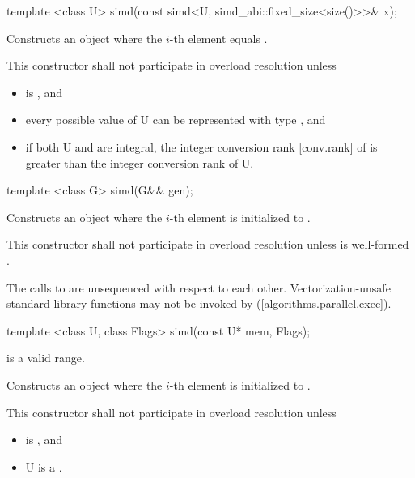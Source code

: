 \begin{itemdecl}
template <class U> simd(const simd<U, simd_abi::fixed_size<size()>>& x);
\end{itemdecl}
\begin{itemdescr}
  \pnum\effects Constructs an object where the $i$-th element equals  \foralli.

  \pnum\remarks This constructor shall not participate in overload resolution unless
  \begin{itemize}
    \item {} is \fixedsizescoped{}, and
    \item every possible value of \type U can be represented with type , and
    \item if both \type U and  are integral, the integer conversion rank [conv.rank] of  is greater than the integer conversion rank of \type U.
  \end{itemize}
\end{itemdescr}

\begin{itemdecl}
template <class G> simd(G&& gen);
\end{itemdecl}
\begin{itemdescr}
  \pnum\effects Constructs an object where the $i$-th element is initialized to .

  \pnum\remarks This constructor shall not participate in overload resolution unless  is well-formed \foralli.

  \pnum%
  The calls to  are unsequenced with respect to each other.
  Vectorization-unsafe standard library functions may not be invoked by  ([algorithms.parallel.exec]).
\end{itemdescr}

\begin{itemdecl}
template <class U, class Flags> simd(const U* mem, Flags);
\end{itemdecl}
\begin{itemdescr}
  \code{[mem, mem + size())} is a valid range.

  \pnum\effects Constructs an object where the $i$-th element is initialized to  \foralli.

  \pnum\remarks This constructor shall not participate in overload resolution unless
  \begin{itemize}
      \item {} is \true, and
      \item \type U is a \realArithmeticType.
  \end{itemize}
\end{itemdescr}

